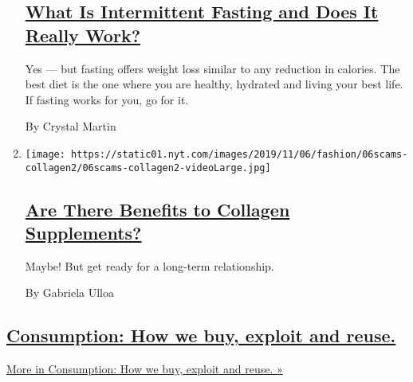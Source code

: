\begin{enumerate}
  \hypertarget{what-is-intermittent-fasting-and-does-it-really-work}{%
  \subsection{\texorpdfstring{\href{/2019/11/23/style/self-care/intermittent-fasting-benefits.html}{What
  Is Intermittent Fasting and Does It Really
  Work?}}{What Is Intermittent Fasting and Does It Really Work?}}\label{what-is-intermittent-fasting-and-does-it-really-work}}

  Yes --- but fasting offers weight loss similar to any reduction in
  calories. The best diet is the one where you are healthy, hydrated and
  living your best life. If fasting works for you, go for it.

  By Crystal Martin
\item
  \texttt{[image: https://static01.nyt.com/images/2019/11/06/fashion/06scams-collagen2/06scams-collagen2-videoLarge.jpg]}

  \hypertarget{are-there-benefits-to-collagen-supplements}{%
  \subsection{\texorpdfstring{\href{/2019/11/09/style/self-care/collagen-benefits.html}{Are
  There Benefits to Collagen
  Supplements?}}{Are There Benefits to Collagen Supplements?}}\label{are-there-benefits-to-collagen-supplements}}

  Maybe! But get ready for a long-term relationship.

  By Gabriela Ulloa
\end{enumerate}

\hypertarget{consumption-how-we-buy-exploit-and-reuse}{%
\subsection{\texorpdfstring{\href{/issue/fashion/2019/12/16/consumption}{Consumption:
How we buy, exploit and
reuse.}}{Consumption: How we buy, exploit and reuse.}}\label{consumption-how-we-buy-exploit-and-reuse}}

\href{/issue/fashion/2019/12/16/consumption}{More in Consumption: How we
buy, exploit and reuse. »}


